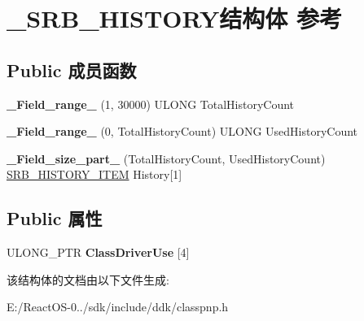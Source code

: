 \hypertarget{struct___s_r_b___h_i_s_t_o_r_y}{}\section{\+\_\+\+S\+R\+B\+\_\+\+H\+I\+S\+T\+O\+R\+Y结构体 参考}
\label{struct___s_r_b___h_i_s_t_o_r_y}
\subsection*{Public 成员函数}
\begin{DoxyCompactItemize}
\item 
\mbox{\label{struct___s_r_b___h_i_s_t_o_r_y_ad22d1c46d0e8aebc4e2f6d3432110760}} 
{\bfseries \+\_\+\+Field\+\_\+range\+\_\+} (1, 30000) U\+L\+O\+NG Total\+History\+Count
\item 
\mbox{\label{struct___s_r_b___h_i_s_t_o_r_y_a1aec6b3584106b879f4d43b700745c72}} 
{\bfseries \+\_\+\+Field\+\_\+range\+\_\+} (0, Total\+History\+Count) U\+L\+O\+NG Used\+History\+Count
\item 
\mbox{\label{struct___s_r_b___h_i_s_t_o_r_y_a9f890304db456d2ffc709c0de1c9c833}} 
{\bfseries \+\_\+\+Field\+\_\+size\+\_\+part\+\_\+} (Total\+History\+Count, Used\+History\+Count) \hyperlink{struct___s_r_b___h_i_s_t_o_r_y___i_t_e_m}{S\+R\+B\+\_\+\+H\+I\+S\+T\+O\+R\+Y\+\_\+\+I\+T\+EM} History\mbox{[}1\mbox{]}
\end{DoxyCompactItemize}
\subsection*{Public 属性}
\begin{DoxyCompactItemize}
\item 
\mbox{\label{struct___s_r_b___h_i_s_t_o_r_y_a0a32cf128b001e10447fb5fdc041aedb}} 
U\+L\+O\+N\+G\+\_\+\+P\+TR {\bfseries Class\+Driver\+Use} \mbox{[}4\mbox{]}
\end{DoxyCompactItemize}


该结构体的文档由以下文件生成\+:\begin{DoxyCompactItemize}
\item 
E\+:/\+React\+O\+S-\/0../sdk/include/ddk/classpnp.\+h\end{DoxyCompactItemize}
